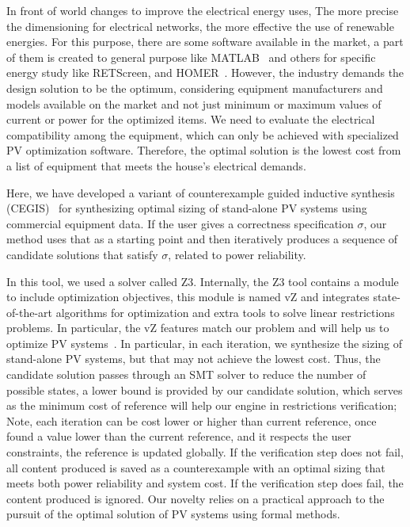 \documentclass[10pt,journal,compsoc]{IEEEtran}
\begin{document}
In front of world changes to improve the electrical energy uses, The more precise the dimensioning for electrical networks, the more effective the use of renewable energies. For this purpose, there are some software available in the market, a part of them is created to general purpose like MATLAB~\cite{Benatiallah2017} and others for specific energy study like RETScreen, and HOMER~\cite{Pradhan,Swarnkar}. However, the
industry demands the design solution to be the optimum, considering equipment manufacturers and models available on the market and not just minimum or maximum
values of current or power for the optimized items. We need to evaluate the electrical compatibility among the equipment, which can only be achieved with specialized PV optimization software. Therefore, the optimal solution is the
lowest cost from a list of equipment that meets the house’s electrical demands.
\color{black}

Here, we have developed a variant of counterexample guided inductive synthesis (CEGIS)~\cite{AbateCAV2018} for synthesizing optimal sizing of stand-alone PV systems using commercial equipment data. If the user gives a correctness specification $\sigma$, our method uses that as a starting point and then iteratively produces a sequence of candidate solutions that satisfy $\sigma$, related to power reliability.


\color{blue} 
In this tool, we used a solver called Z3. Internally, the Z3 tool contains a module to include optimization objectives, this module is named vZ and integrates state-of-the-art algorithms for optimization and extra tools to solve linear restrictions problems. In particular, the vZ features match our problem and will help us to optimize PV systems~\cite{BjornerPF15}.
In particular, in each iteration, we synthesize the sizing of stand-alone PV systems, but that may not achieve the lowest cost. Thus, the candidate solution passes through an SMT solver to reduce the number of possible states, a lower bound is provided by our candidate solution, which serves as the minimum cost of reference will help our engine in restrictions verification; Note, each iteration can be cost lower or higher than current reference, once found a value lower than the current reference, and it respects the user constraints, the reference is updated globally. 
If the verification step does not fail, all content produced is saved as a counterexample with an optimal sizing that meets both power reliability and system cost. If the verification step does fail, the content produced is ignored. Our novelty relies on a practical approach to the pursuit of the optimal solution of PV systems using formal methods. 
\end{document}
